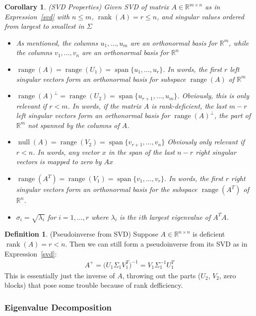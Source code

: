\documentclass[12pt]{article}
\numberwithin{equation}{section} %
\theoremstyle{plain}
\newtheorem{cor}[thm]{Corollary}
\theoremstyle{definition}
\newtheorem{defn}[thm]{Definition}
\theoremstyle{remark}
\newcommand{\Rn}{\mathbb{R}^n}
\newcommand{\Rm}{\mathbb{R}^m}
\newcommand{\Rmn}{\mathbb{R}^{m\times n}}
\newcommand{\Rnn}{\mathbb{R}^{n\times n}}
\newcommand{\nul}{\operatorname{null}}
\newcommand{\range}{\operatorname{range}}
\newcommand{\rank}{\operatorname{rank}}
\newcommand{\spann}{\operatorname{span}}
\begin{document}
\clearpage
\begin{cor}\emph{(SVD Properties)}
Given SVD of matrix $A\in\Rmn$ as in Expression~\ref{svd} with $n\leq
m$, $\rank(A)=r\leq n$, and singular values ordered from largest to
smallest in $\Sigma$
\begin{itemize}
  \item As mentioned, the columns $u_1,\ldots,u_m$ are an orthonormal
    basis for $\Rm$, while the columns $v_1,\ldots,v_n$ are an
    orthonormal basis for $\Rn$
  \item $\range(A)=\range(U_1)=\spann\{u_{1},\ldots,u_r\}$. In words,
    the first $r$ left singular vectors form an orthonormal basis for
    subspace $\range(A)$ of $\Rm$
  \item
    $\range(A)^\perp=\range(U_2)=\spann\{u_{r+1},\ldots,u_m\}$.
    Obviously, this is only relevant if $r<m$.
    In words, if the matrix $A$ is rank-deficient, the last $m-r$ left
    singular vectors form an orthonormal basis for $\range(A)^\perp$,
    the part of $\Rm$ \emph{not} spanned by the columns of $A$.
  \item $\nul(A)=\range(V_2)=\spann\{v_{r+1},\ldots,v_n\}$
    Obviously only relevant if $r<n$.
    In words, any vector $x$ in the span of the last $n-r$ right
    singular vectors is mapped to zero by $Ax$
  \item $\range(A^T)=\range(V_1)=\spann\{v_1,\ldots,v_r\}$.
    In words, the first $r$ right singular vectors form an orthonormal
    basis for the subspace $\range(A^T)$ of $\Rn$.
  \item $\sigma_i = \sqrt{\lambda_i}$ for $i=1,\ldots,r$ where
    $\lambda_i$ is the $i$th largest eigenvalue of $A^TA$.
\end{itemize}
\end{cor}

\begin{defn}(Pseudoinverse from SVD)
Suppose $A\in\Rnn$ is deficient $\rank(A)=r<n$. Then we can
still form a pseudoinverse from its SVD as in Expression~\ref{svd}:
\begin{align*}
  A^+ =
  \big(
  U_1\Sigma_1 V^T_1
  \big)^{-1}
  =
  V_1\Sigma_1^{-1}U_1^T
\end{align*}
This is essentially just the inverse of $A$, throwing out the parts
($U_2$, $V_2$, zero blocks) that pose some trouble because of rank
defficiency.
\end{defn}

\clearpage
\subsubsection{Eigenvalue Decomposition}
\label{subsec:eigenvaluedecomp}
\end{document}
